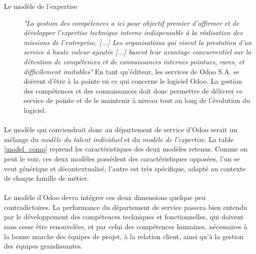 \begin{description}
  \item[Le modèle de l'expertise]
  \textit{"La gestion des compétences a ici pour objectif premier d'affirmer et de développer l'expertise technique interne indispensable à la réalisation des missions de l'entreprise. [...] Les organisations qui visent la prestation d'un service à haute valeur ajoutée [...] basent leur avantage concurrentiel sur la détention de compétences et de connaissances internes pointues, rares, et difficilement imitables"}\citep[pp.45]{delobbe} En tant qu'éditeur, les services de Odoo S.A. se doivent d'être à la pointe en ce qui concerne le logiciel Odoo. La gestion des compétences et des connaissances doit donc permettre de délivrer ce service de pointe et de le maintenir à niveau tout au long de l'évolution du logiciel. 
\end{description}


\paragraph{}Le modèle qui conviendrait donc au département de service d'Odoo serait un mélange du \textit{modèle du talent individuel} et du \textit{modèle de l'expertise}. La table \ref{model_comp} reprend les caractéristiques des deux modèles retenus. Comme on peut le voir, ces deux modèles possèdent des caractéristiques opposées, l'un se veut générique et décontextualisé, l'autre est très spécifique, adapté au contexte de chaque famille de métier. 

\paragraph{}Le modèle d'Odoo devra intégrer ces deux dimensions quelque peu contradictoires.
La performance du département de service passera bien entendu par le développement des compétences techniques et fonctionnelles, qui doivent sans cesse être renouvelées, et par celui des compétences humaines, nécessaires à la bonne marche des équipes de projet, à la relation client, ainsi qu'à la gestion des équipes grandissantes.



